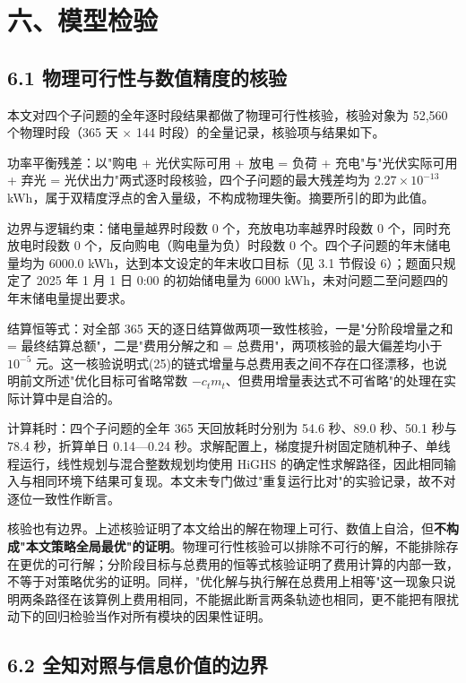\documentclass[12pt,a4paper]{ctexart}
\begin{document}
\section*{六、模型检验}

\subsection*{6.1 物理可行性与数值精度的核验}

本文对四个子问题的全年逐时段结果都做了物理可行性核验，核验对象为 52,560 个物理时段（365 天 $\times$ 144 时段）的全量记录，核验项与结果如下。

功率平衡残差：以"购电 + 光伏实际可用 + 放电 = 负荷 + 充电"与"光伏实际可用 + 弃光 = 光伏出力"两式逐时段核验，四个子问题的最大残差均为 $2.27\times10^{-13}$ kWh，属于双精度浮点的舍入量级，不构成物理失衡。摘要所引的即为此值。

边界与逻辑约束：储电量越界时段数 0 个，充放电功率越界时段数 0 个，同时充放电时段数 0 个，反向购电（购电量为负）时段数 0 个。四个子问题的年末储电量均为 6000.0 kWh，达到本文设定的年末收口目标（见 3.1 节假设 6）；题面只规定了 2025 年 1 月 1 日 0:00 的初始储电量为 6000 kWh，未对问题二至问题四的年末储电量提出要求。

结算恒等式：对全部 365 天的逐日结算做两项一致性核验，一是"分阶段增量之和 = 最终结算总额"，二是"费用分解之和 = 总费用"，两项核验的最大偏差均小于 $10^{-5}$ 元。这一核验说明式(25)的链式增量与总费用表之间不存在口径漂移，也说明前文所述"优化目标可省略常数 $-c_t m_t$、但费用增量表达式不可省略"的处理在实际计算中是自洽的。

计算耗时：四个子问题的全年 365 天回放耗时分别为 54.6 秒、89.0 秒、50.1 秒与 78.4 秒，折算单日 0.14—0.24 秒。求解配置上，梯度提升树固定随机种子、单线程运行，线性规划与混合整数规划均使用 HiGHS 的确定性求解路径，因此相同输入与相同环境下结果可复现。本文未专门做过"重复运行比对"的实验记录，故不对逐位一致性作断言。

核验也有边界。上述核验证明了本文给出的解在物理上可行、数值上自洽，但\textbf{不构成"本文策略全局最优"的证明}。物理可行性核验可以排除不可行的解，不能排除存在更优的可行解；分阶段目标与总费用的恒等式核验证明了费用计算的内部一致，不等于对策略优劣的证明。同样，"优化解与执行解在总费用上相等"这一现象只说明两条路径在该算例上费用相同，不能据此断言两条轨迹也相同，更不能把有限扰动下的回归检验当作对所有模块的因果性证明。

\subsection*{6.2 全知对照与信息价值的边界}
\end{document}
